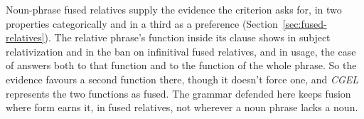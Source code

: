 Noun-phrase fused relatives supply the evidence the criterion asks for, in two properties categorically and in a third as a preference (Section~\ref{sec:fused-relatives}). The relative phrase's function inside its clause shows in subject relativization and in the ban on infinitival fused relatives, and in usage, the case of  answers both to that function and to the function of the whole phrase. So the evidence favours a second function there, though it doesn't force one, and \textit{CGEL} represents the two functions as fused. The grammar defended here keeps fusion where form earns it, in fused relatives, not wherever a noun phrase lacks a noun.

